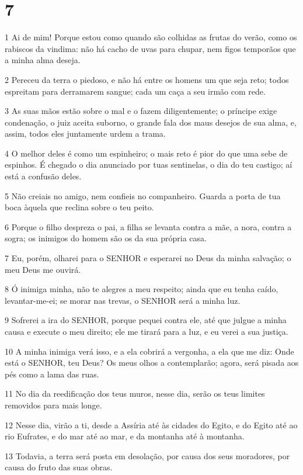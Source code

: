 \chapter{7}

\par 1 Ai de mim! Porque estou como quando são colhidas as frutas do verão, como os rabiscos da vindima: não há cacho de uvas para chupar, nem figos temporãos que a minha alma deseja.
\par 2 Pereceu da terra o piedoso, e não há entre os homens um que seja reto; todos espreitam para derramarem sangue; cada um caça a seu irmão com rede.
\par 3 As suas mãos estão sobre o mal e o fazem diligentemente; o príncipe exige condenação, o juiz aceita suborno, o grande fala dos maus desejos de sua alma, e, assim, todos eles juntamente urdem a trama.
\par 4 O melhor deles é como um espinheiro; o mais reto é pior do que uma sebe de espinhos. É chegado o dia anunciado por tuas sentinelas, o dia do teu castigo; aí está a confusão deles.
\par 5 Não creiais no amigo, nem confieis no companheiro. Guarda a porta de tua boca àquela que reclina sobre o teu peito.
\par 6 Porque o filho despreza o pai, a filha se levanta contra a mãe, a nora, contra a sogra; os inimigos do homem são os da sua própria casa.
\par 7 Eu, porém, olharei para o SENHOR e esperarei no Deus da minha salvação; o meu Deus me ouvirá.
\par 8 Ó inimiga minha, não te alegres a meu respeito; ainda que eu tenha caído, levantar-me-ei; se morar nas trevas, o SENHOR será a minha luz.
\par 9 Sofrerei a ira do SENHOR, porque pequei contra ele, até que julgue a minha causa e execute o meu direito; ele me tirará para a luz, e eu verei a sua justiça.
\par 10 A minha inimiga verá isso, e a ela cobrirá a vergonha, a ela que me diz: Onde está o SENHOR, teu Deus? Os meus olhos a contemplarão; agora, será pisada aos pés como a lama das ruas.
\par 11 No dia da reedificação dos teus muros, nesse dia, serão os teus limites removidos para mais longe.
\par 12 Nesse dia, virão a ti, desde a Assíria até às cidades do Egito, e do Egito até ao rio Eufrates, e do mar até ao mar, e da montanha até à montanha.
\par 13 Todavia, a terra será posta em desolação, por causa dos seus moradores, por causa do fruto das suas obras.
